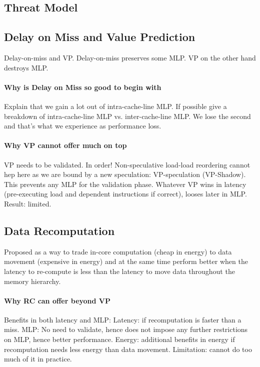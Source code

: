 \subsection{Threat Model}
\label{sec:threat}

\subsection{Delay on Miss and Value Prediction}
\label{sec:dom-vp}
Delay-on-miss and VP. Delay-on-miss preserves some MLP. VP on the other hand destroys MLP.

\paragraph{Why is Delay on Miss so good to begin with}
Explain that we gain a lot out of intra-cache-line MLP.
If possible give a breakdown of intra-cache-line MLP vs. inter-cache-line MLP.
We lose the second and that's what we experience as performance loss.

\paragraph{Why VP cannot offer much on top}
VP needs to be validated. In order! Non-speculative load-load reordering cannot hep here as we are bound by a new speculation: VP-speculation (VP-Shadow). This prevents any MLP for the validation phase. Whatever VP wins in latency (pre-executing load and dependent instructions if correct), looses later in MLP. Result: limited.

\subsection{Data Recomputation}
\label{sec:recmp}
Proposed as a way to trade in-core computation (cheap in energy) to data movement (expensive in energy) and at the same time perform better when the latency to re-compute is less than the latency to move data throughout the memory hierarchy.
\paragraph{Why RC can offer beyond VP}
Benefits in both latency and MLP: Latency: if recomputation is faster than a miss. MLP: No need to validate, hence does not impose any further restrictions on MLP, hence better performance. Energy: additional benefits in energy if recomputation needs less energy than data movement. Limitation: cannot do too much of it in practice.



 